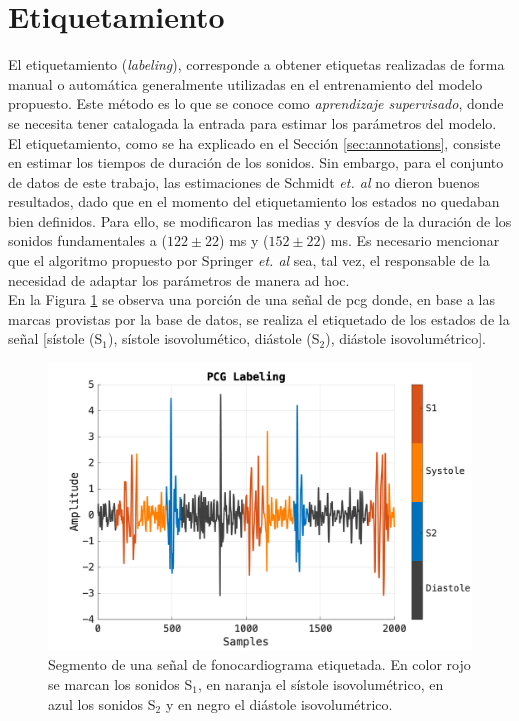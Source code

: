 \section{Etiquetamiento}

\indent El etiquetamiento (\textit{labeling}), corresponde a obtener etiquetas realizadas de forma manual o
automática generalmente utilizadas en el entrenamiento del modelo propuesto. Este método es lo que se conoce como
\textit{aprendizaje supervisado}, donde se necesita tener catalogada la entrada para estimar los parámetros del
modelo. \\
\indent El etiquetamiento, como se ha explicado en el Sección \ref{sec:annotations}, consiste en estimar los tiempos
de duración de los sonidos. Sin embargo, para el conjunto de datos de este trabajo, las estimaciones de Schmidt
\textit{et. al} no dieron buenos resultados, dado que en el momento del etiquetamiento los estados no quedaban
bien definidos. Para ello, se modificaron las medias y desvíos de la duración de los sonidos fundamentales
a ($122 \pm 22$) ms y ($152 \pm 22$) ms.
Es necesario mencionar que el algoritmo propuesto por Springer \textit{et. al} sea, tal vez, el responsable de
la necesidad de adaptar los parámetros de manera ad hoc. \\
\indent En la Figura \ref{fig:pcg-labeling} se observa una porción de una señal de \acrshort{pcg} donde, en base a
las marcas provistas por la base de datos, se realiza el etiquetado de los estados de la señal [sístole (S$_1$),
sístole isovolumético, diástole (S$_2$), diástole isovolumétrico].

\begin{figure}[H]
  \centering
  \includegraphics[scale=0.3]{sections/chapter-04/images/pcg-labeling.png}
  \caption[Segmento de una señal de fonocardiograma etiquetada]{Segmento de una señal de fonocardiograma
  etiquetada. En color rojo se marcan los sonidos S$_1$, en naranja el sístole isovolumétrico, en azul los sonidos
  S$_2$ y en negro el diástole isovolumétrico.}
  \label{fig:pcg-labeling}
\end{figure}

